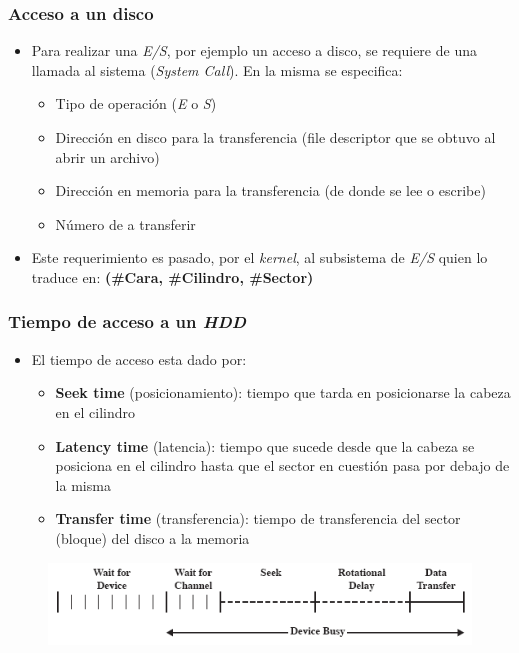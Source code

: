 \begin{frame}
  \frametitle{Acceso a un disco}
  \begin{itemize}
    \item Para realizar una \emph{E/S}, por ejemplo un acceso a disco, se requiere de una llamada al sistema (\textit{System Call}). En la misma se especifica:
    \begin{itemize}
      \item Tipo de operación (\emph{E} o \emph{S})
      \item Dirección en disco para la transferencia (file descriptor que se obtuvo al abrir un archivo)
      \item Dirección en memoria para la transferencia (de donde se lee o escribe)
      \item Número de \bytes a transferir
    \end{itemize}
    \item Este requerimiento es pasado, por el \textit{kernel}, al subsistema de \emph{E/S} quien lo traduce en: \textbf{(\#Cara, \#Cilindro, \#Sector)}
  \end{itemize}
\end{frame}

\begin{frame}
  \frametitle{Tiempo de acceso a un \textit{HDD}}
  \begin{itemize}
    \item El tiempo de acceso esta dado por:
    \begin{itemize}
      \item \textbf{Seek time} (posicionamiento): tiempo que tarda en posicionarse la cabeza en el cilindro 
      \item \textbf{Latency time} (latencia): tiempo que sucede desde que la cabeza se posiciona en el cilindro hasta que el sector en cuestión pasa por debajo de la misma
      \item \textbf{Transfer time} (transferencia): tiempo de transferencia del sector (bloque) del disco a la memoria
    \end{itemize}    
  \end{itemize}
  \begin{figure}
      \includegraphics[scale=0.4]{images/dat.png}
  \end{figure}
\end{frame}

